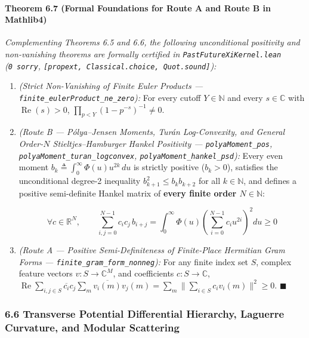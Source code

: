 \documentclass[
  11pt,
]{article}
\begin{document}
\paragraph{Theorem 6.7 (Formal Foundations for Route A and Route B in
Mathlib4)}\label{theorem-6.7-formal-foundations-for-route-a-and-route-b-in-mathlib4}

\emph{Complementing Theorems 6.5 and 6.6, the following unconditional
positivity and non-vanishing theorems are formally certified in
\texttt{PastFutureXiKernel.lean} (\texttt{0\ sorry},
\texttt{{[}propext,\ Classical.choice,\ Quot.sound{]}}):}

\begin{enumerate}
\def\labelenumi{\arabic{enumi}.}
\item
  \emph{(Strict Non-Vanishing of Finite Euler Products ---
  \texttt{finite\_eulerProduct\_ne\_zero}):} For every cutoff
  \(Y \in \mathbb{N}\) and every \(s \in \mathbb{C}\) with
  \(\operatorname{Re}(s) > 0\),
  \(\prod_{p < Y} (1 - p^{-s})^{-1} \neq 0\).
\item
  \emph{(Route B --- Pólya--Jensen Moments, Turán Log-Convexity, and
  General Order-\(N\) Stieltjes--Hamburger Hankel Positivity ---
  \texttt{polyaMoment\_pos}, \texttt{polyaMoment\_turan\_logconvex},
  \texttt{polyaMoment\_hankel\_psd}):} Every even moment
  \(b_k \triangleq \int_0^\infty \Phi(u) u^{2k}\,du\) is strictly
  positive (\(b_k > 0\)), satisfies the unconditional degree-2
  inequality \(b_{k+1}^2 \le b_k b_{k+2}\) for all \(k \in \mathbb{N}\),
  and defines a positive semi-definite Hankel matrix of \textbf{every
  finite order \(N \in \mathbb{N}\)}:

  \[\forall c \in \mathbb{R}^N, \qquad \sum_{i,j=0}^{N-1} c_i c_j\, b_{i+j} = \int_0^\infty \Phi(u)\left(\sum_{i=0}^{N-1} c_i u^{2i}\right)^2 du \ge 0\]
\item
  \emph{(Route A --- Positive Semi-Definiteness of Finite-Place
  Hermitian Gram Forms --- \texttt{finite\_gram\_form\_nonneg}):} For
  any finite index set \(S\), complex feature vectors
  \(v : S \to \mathbb{C}^M\), and coefficients \(c : S \to \mathbb{C}\),
  \(\operatorname{Re}\sum_{i,j \in S} \overline{c_i} c_j \sum_m \overline{v_i(m)} v_j(m) = \sum_m \big\|\sum_{i \in S} c_i v_i(m)\big\|^2 \ge 0\).
  \(\blacksquare\)
\end{enumerate}

\subsubsection{6.6 Transverse Potential Differential Hierarchy, Laguerre
Curvature, and Modular
Scattering}\label{transverse-potential-differential-hierarchy-laguerre-curvature-and-modular-scattering}
\end{document}
